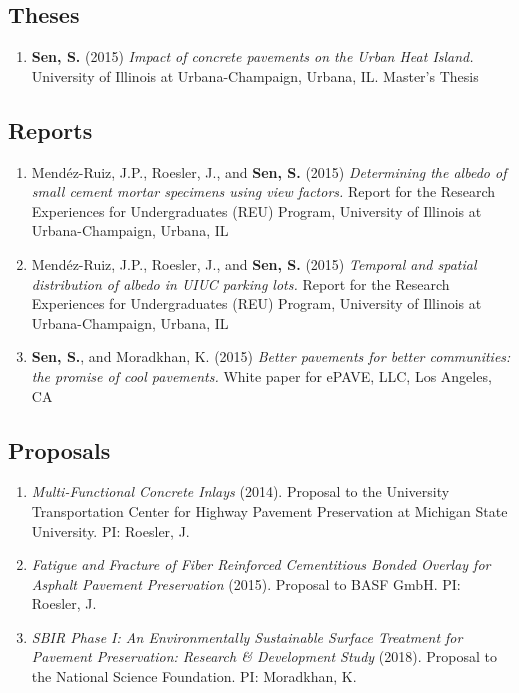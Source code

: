 \documentclass[12pt]{article}
\begin{document}
\subsection*{Theses}
\begin{enumerate}[label=(T\arabic*)]
	\item \textbf{Sen, S.} (2015) \textit{Impact of concrete pavements on the 		Urban Heat Island.} University of Illinois at Urbana-Champaign, Urbana, IL. Master’s Thesis
\end{enumerate}

\subsection*{Reports}
\begin{enumerate}[label=(R\arabic*)]
	\item Mend\'ez-Ruiz, J.P., Roesler, J., and \textbf{Sen, S.} (2015) \textit{Determining the albedo of small cement mortar specimens using view factors.} Report for the Research Experiences for Undergraduates (REU) Program, University of Illinois at Urbana-Champaign, Urbana, IL
	\item Mend\'ez-Ruiz, J.P., Roesler, J., and \textbf{Sen, S.} (2015) \textit{Temporal and spatial distribution of albedo in UIUC parking lots.} Report for the Research Experiences for Undergraduates (REU) Program, University of Illinois at Urbana-Champaign, Urbana, IL
	\item \textbf{Sen, S.}, and Moradkhan, K. (2015) \textit{Better pavements for better communities: the promise of cool pavements.} White paper for ePAVE, LLC, Los Angeles, CA
\end{enumerate}

\subsection*{Proposals}
\begin{enumerate}[label=(P\arabic*)]
	\item \textit{Multi-Functional Concrete Inlays} (2014). Proposal to the University Transportation Center for Highway Pavement Preservation at Michigan State University. PI: Roesler, J. 
	\item \textit{Fatigue and Fracture of Fiber Reinforced Cementitious Bonded Overlay for Asphalt Pavement Preservation} (2015). Proposal to BASF GmbH. PI: Roesler, J. 
	\item \textit{SBIR Phase I: An Environmentally Sustainable Surface Treatment for Pavement Preservation: Research \& Development Study} (2018). Proposal to the National Science Foundation. PI: Moradkhan, K.
\end{enumerate}
\end{document}
